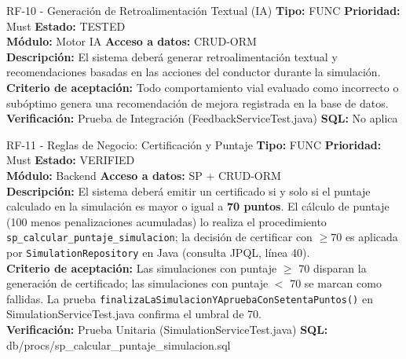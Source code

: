 \documentclass[11pt,a4paper]{article}
\begin{document}
\begin{requisito}{RF-10 - Generación de Retroalimentación Textual (IA)}
    \textbf{Tipo:} FUNC \quad \textbf{Prioridad:} Must \quad \textbf{Estado:} TESTED \\[0.2cm]
    \textbf{Módulo:} Motor IA \quad \textbf{Acceso a datos:} CRUD-ORM \\[0.2cm]
    \textbf{Descripción:} El sistema deberá generar retroalimentación textual y recomendaciones basadas en las acciones del conductor durante la simulación. \\[0.2cm]
    \textbf{Criterio de aceptación:} Todo comportamiento vial evaluado como incorrecto o subóptimo genera una recomendación de mejora registrada en la base de datos. \\[0.2cm]
    \textbf{Verificación:} Prueba de Integración (FeedbackServiceTest.java) \quad \textbf{SQL:} No aplica
\end{requisito}

\begin{requisito}{RF-11 - Reglas de Negocio: Certificación y Puntaje}
    \textbf{Tipo:} FUNC \quad \textbf{Prioridad:} Must \quad \textbf{Estado:} VERIFIED \\[0.2cm]
    \textbf{Módulo:} Backend \quad \textbf{Acceso a datos:} SP + CRUD-ORM \\[0.2cm]
    \textbf{Descripción:} El sistema deberá emitir un certificado si y solo si el puntaje calculado en la simulación es mayor o igual a \textbf{70 puntos}. El cálculo de puntaje (100 menos penalizaciones acumuladas) lo realiza el procedimiento \texttt{sp\_calcular\_puntaje\_simulacion}; la decisión de certificar con $\geq 70$ es aplicada por \texttt{SimulationRepository} en Java (consulta JPQL, línea 40). \\[0.2cm]
    \textbf{Criterio de aceptación:} Las simulaciones con puntaje $\geq$ 70 disparan la generación de certificado; las simulaciones con puntaje $<$ 70 se marcan como fallidas. La prueba \texttt{finalizaLaSimulacionYApruebaConSetentaPuntos()} en SimulationServiceTest.java confirma el umbral de 70. \\[0.2cm]
    \textbf{Verificación:} Prueba Unitaria (SimulationServiceTest.java) \quad \textbf{SQL:} db/procs/sp\_calcular\_puntaje\_simulacion.sql
\end{requisito}
\end{document}
